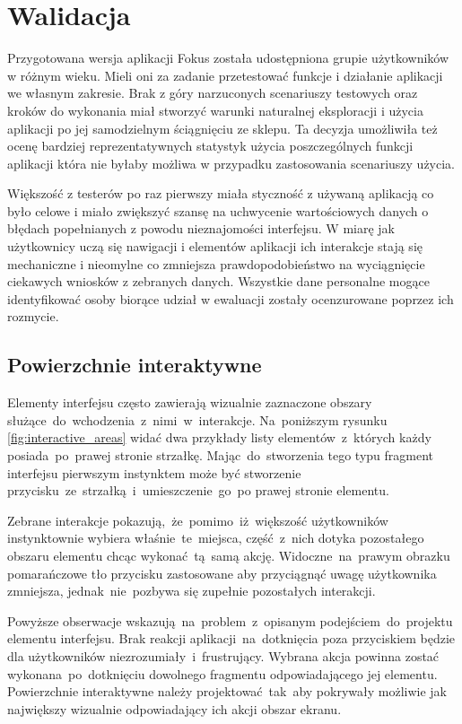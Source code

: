 \section{Walidacja}
Przygotowana wersja aplikacji Fokus została udostępniona grupie użytkowników w różnym wieku. Mieli oni za zadanie przetestować funkcje i działanie aplikacji we własnym zakresie. Brak z góry narzuconych scenariuszy testowych oraz kroków do wykonania miał stworzyć warunki naturalnej eksploracji i użycia aplikacji po jej samodzielnym ściągnięciu ze sklepu. Ta decyzja umożliwiła też ocenę bardziej reprezentatywnych statystyk użycia poszczególnych funkcji aplikacji która nie byłaby możliwa w przypadku zastosowania scenariuszy użycia. 

Większość z testerów po raz pierwszy miała styczność z używaną aplikacją co było celowe i miało zwiększyć szansę na uchwycenie wartościowych danych o błędach popełnianych z powodu nieznajomości interfejsu. W miarę jak użytkownicy uczą się nawigacji i elementów aplikacji ich interakcje stają się mechaniczne i nieomylne co zmniejsza prawdopodobieństwo na wyciągnięcie ciekawych wniosków z zebranych danych. Wszystkie dane personalne mogące identyfikować osoby biorące udział w ewaluacji zostały ocenzurowane poprzez ich rozmycie.

\subsection{Powierzchnie interaktywne}
Elementy interfejsu często zawierają wizualnie zaznaczone obszary służące~do~wchodzenia~z~nimi~w~interakcje. Na~poniższym rysunku \ref{fig:interactive_areas} widać dwa przykłady listy elementów~z~których każdy posiada~po~prawej stronie strzałkę. Mając~do~stworzenia tego typu fragment interfejsu pierwszym instynktem może być stworzenie przycisku~ze~strzałką~i~umieszczenie~go~po prawej stronie elementu.

Zebrane interakcje pokazują,~że~pomimo~iż~większość użytkowników instynktownie wybiera właśnie~te~miejsca, część~z~nich dotyka pozostałego obszaru elementu chcąc wykonać~tą~samą akcję. Widoczne~na~prawym obrazku pomarańczowe tło przycisku zastosowane aby przyciągnąć uwagę użytkownika zmniejsza, jednak~nie~pozbywa się zupełnie pozostałych interakcji. 

Powyższe obserwacje wskazują~na~problem~z~opisanym podejściem~do~projektu elementu interfejsu. Brak reakcji aplikacji~na~dotknięcia poza przyciskiem będzie dla użytkowników niezrozumiały~i~frustrujący. Wybrana akcja powinna zostać wykonana~po~dotknięciu dowolnego fragmentu odpowiadającego jej elementu. Powierzchnie interaktywne należy projektować~tak~aby pokrywały możliwie jak największy wizualnie odpowiadający ich akcji obszar ekranu.

